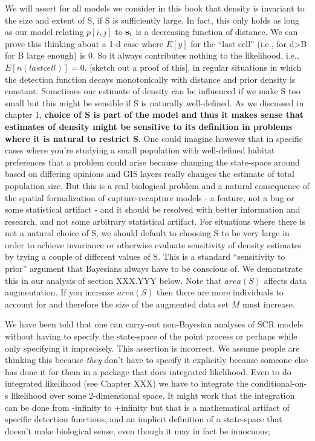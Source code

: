 We will assert for all models we consider in this book that density is invariant to the size and extent of S, if S is sufficiently large. In fact, this only holds as long as our model relating $p[i,j]$ to ${\bf s}_{i}$ is a decreasing function of distance.  We can prove this thinking about a 1-d case where $E[y]$ for the ``last cell'' (i.e., for d>B for B large enough) is 0. So it always contributes nothing to the likelihood, i.e., $E[n(last cell)] = 0$. [sketch out a proof of this], in regular situations in which the detection function decays monotonically with distance and prior density is constant.
Sometimes our estimate of density can be influenced if we make S too
small but this might be sensible if S is naturally well-defined. As we
discussed in chapter 1, {\bf choice of S is part of the model and thus it makes sense that estimates of density might be sensitive to its definition in problems where it is natural to restrict S}.  One could imagine however that in specific cases where you're studying a small population with well-defined habitat preferences that a problem could arise because changing the state-space around based on differing opinions and GIS layers really changes the estimate of total population size. But this is a real biological problem and a natural consequence of the spatial formalization of capture-recapture models - a feature, not a bug or some statistical artifact - and it should be resolved with better information and research, and not some arbitrary statistical artifact.  For situations where there is not a natural choice of S, we should default to choosing S to be very large in order to achieve invariance or otherwise evaluate sensitivity of density estimates by trying a couple of different values of S. This is a standard ``sensitivity to prior'' argument that Bayesians always have to be conscious of.   We demonstrate this in our analysis of section XXX.YYY below. Note that $area(S)$ affects data augmentation. If you increase $area(S)$ then there are more individuals to account for and therefore the size of the augmented data set $M$ must increase. 

We have been told that one can carry-out non-Bayesian analyses of SCR
models without having to specify the state-space of the point process
or perhaps while only specifying it imprecisely.  This assertion is
incorrect. We assume people are thinking this because {\it they} don't
have to specify it explicitly because someone else has done it for
them in a package that does integrated likelihood. Even to do
integrated likelihood (see Chapter XXX) we have to integrate the
conditional-on-s likelihood over some 2-dimensional space.  It might
work that the integration can be done from -infinity to +infinity but
that is a mathematical artifact of specific detection functions, and
an implicit definition of a state-space that doesn't make biological
sense, even though it may in fact be innocuous;


